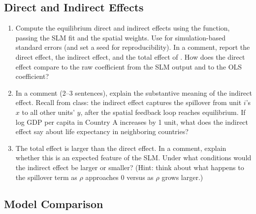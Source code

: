 \subsection{Direct and Indirect Effects}

\begin{enumerate}[label=\alph*)]

  \item Compute the equilibrium direct and indirect effects using the  function, passing the SLM fit and the spatial weights. Use  for simulation-based standard errors (and set a seed for reproducibility). In a comment, report the direct effect, the indirect effect, and the total effect of . How does the direct effect compare to the raw  coefficient from the SLM output and to the OLS coefficient?

  \item In a comment (2--3 sentences), explain the substantive meaning of the indirect effect. Recall from class: the indirect effect captures the spillover from unit $i$'s $x$ to all other units' $y$, after the spatial feedback loop reaches equilibrium. If log GDP per capita in Country A increases by 1 unit, what does the indirect effect say about life expectancy in neighboring countries?

  \item The total effect is larger than the direct effect. In a comment, explain whether this is an expected feature of the SLM. Under what conditions would the indirect effect be larger or smaller? (Hint: think about what happens to the spillover term as $\rho$ approaches 0 versus as $\rho$ grows larger.)

\end{enumerate}

\subsection{Model Comparison}

